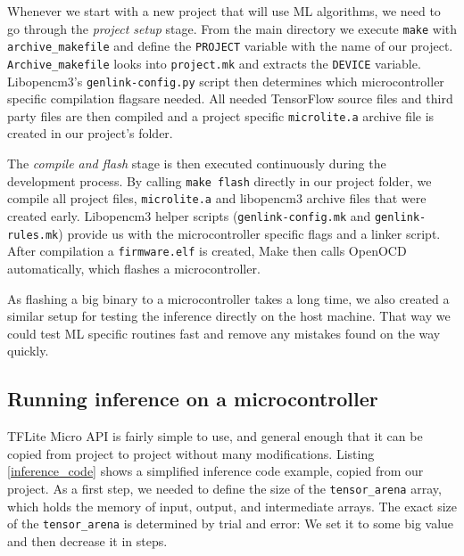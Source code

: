 Whenever we start with a new project that will use ML algorithms, we need to go through the \textit{project setup} stage.
From the main directory we execute \verb|make| with \verb|archive_makefile| and define the \verb|PROJECT| variable with the name of our project.
\verb|Archive_makefile| looks into \verb|project.mk| and extracts the \verb|DEVICE| variable.
Libopencm3's \verb|genlink-config.py| script then determines which microcontroller specific compilation flags\footnotemark are needed. 
All needed TensorFlow source files and third party files are then compiled and a project specific \verb|microlite.a| archive file is created in our project's folder.

The \textit{compile and flash} stage is then executed continuously during the development process.
By calling \verb|make flash| directly in our project folder, we compile all project files, \verb|microlite.a| and libopencm3 archive files that were created early.
Libopencm3 helper scripts (\verb|genlink-config.mk| and \verb|genlink-rules.mk|) provide us with the microcontroller specific flags and a linker script.
After compilation a \verb|firmware.elf| is created, Make then calls OpenOCD automatically, which flashes a microcontroller.

As flashing a big binary to a microcontroller takes a long time, we also created a similar setup for testing the inference directly on the host machine.
That way we could test ML specific routines fast and remove any mistakes found on the way quickly.


\subsection{ Running inference on a microcontroller}

TFLite Micro API is fairly simple to use, and general enough that it can be copied from project to project without many modifications.
Listing \ref{inference_code} shows a simplified inference code example, copied from our project.
As a first step, we needed to define the size of the \verb|tensor_arena| array, which holds the memory of input, output, and intermediate arrays.
The exact size of the \verb|tensor_arena| is determined by trial and error: We set it to some big value and then decrease it in steps.

